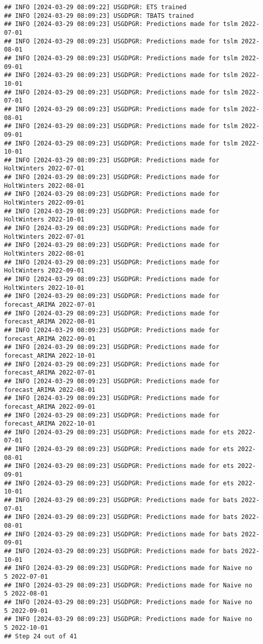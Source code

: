 \documentclass[
]{article}
\begin{document}
\begin{verbatim}
## INFO [2024-03-29 08:09:22] USGDPGR: ETS trained
## INFO [2024-03-29 08:09:23] USGDPGR: TBATS trained
## INFO [2024-03-29 08:09:23] USGDPGR: Predictions made for tslm 2022-07-01
## INFO [2024-03-29 08:09:23] USGDPGR: Predictions made for tslm 2022-08-01
## INFO [2024-03-29 08:09:23] USGDPGR: Predictions made for tslm 2022-09-01
## INFO [2024-03-29 08:09:23] USGDPGR: Predictions made for tslm 2022-10-01
## INFO [2024-03-29 08:09:23] USGDPGR: Predictions made for tslm 2022-07-01
## INFO [2024-03-29 08:09:23] USGDPGR: Predictions made for tslm 2022-08-01
## INFO [2024-03-29 08:09:23] USGDPGR: Predictions made for tslm 2022-09-01
## INFO [2024-03-29 08:09:23] USGDPGR: Predictions made for tslm 2022-10-01
## INFO [2024-03-29 08:09:23] USGDPGR: Predictions made for HoltWinters 2022-07-01
## INFO [2024-03-29 08:09:23] USGDPGR: Predictions made for HoltWinters 2022-08-01
## INFO [2024-03-29 08:09:23] USGDPGR: Predictions made for HoltWinters 2022-09-01
## INFO [2024-03-29 08:09:23] USGDPGR: Predictions made for HoltWinters 2022-10-01
## INFO [2024-03-29 08:09:23] USGDPGR: Predictions made for HoltWinters 2022-07-01
## INFO [2024-03-29 08:09:23] USGDPGR: Predictions made for HoltWinters 2022-08-01
## INFO [2024-03-29 08:09:23] USGDPGR: Predictions made for HoltWinters 2022-09-01
## INFO [2024-03-29 08:09:23] USGDPGR: Predictions made for HoltWinters 2022-10-01
## INFO [2024-03-29 08:09:23] USGDPGR: Predictions made for forecast_ARIMA 2022-07-01
## INFO [2024-03-29 08:09:23] USGDPGR: Predictions made for forecast_ARIMA 2022-08-01
## INFO [2024-03-29 08:09:23] USGDPGR: Predictions made for forecast_ARIMA 2022-09-01
## INFO [2024-03-29 08:09:23] USGDPGR: Predictions made for forecast_ARIMA 2022-10-01
## INFO [2024-03-29 08:09:23] USGDPGR: Predictions made for forecast_ARIMA 2022-07-01
## INFO [2024-03-29 08:09:23] USGDPGR: Predictions made for forecast_ARIMA 2022-08-01
## INFO [2024-03-29 08:09:23] USGDPGR: Predictions made for forecast_ARIMA 2022-09-01
## INFO [2024-03-29 08:09:23] USGDPGR: Predictions made for forecast_ARIMA 2022-10-01
## INFO [2024-03-29 08:09:23] USGDPGR: Predictions made for ets 2022-07-01
## INFO [2024-03-29 08:09:23] USGDPGR: Predictions made for ets 2022-08-01
## INFO [2024-03-29 08:09:23] USGDPGR: Predictions made for ets 2022-09-01
## INFO [2024-03-29 08:09:23] USGDPGR: Predictions made for ets 2022-10-01
## INFO [2024-03-29 08:09:23] USGDPGR: Predictions made for bats 2022-07-01
## INFO [2024-03-29 08:09:23] USGDPGR: Predictions made for bats 2022-08-01
## INFO [2024-03-29 08:09:23] USGDPGR: Predictions made for bats 2022-09-01
## INFO [2024-03-29 08:09:23] USGDPGR: Predictions made for bats 2022-10-01
## INFO [2024-03-29 08:09:23] USGDPGR: Predictions made for Naive no  5 2022-07-01
## INFO [2024-03-29 08:09:23] USGDPGR: Predictions made for Naive no  5 2022-08-01
## INFO [2024-03-29 08:09:23] USGDPGR: Predictions made for Naive no  5 2022-09-01
## INFO [2024-03-29 08:09:23] USGDPGR: Predictions made for Naive no  5 2022-10-01
## Step 24 out of 41
\end{verbatim}
\end{document}
